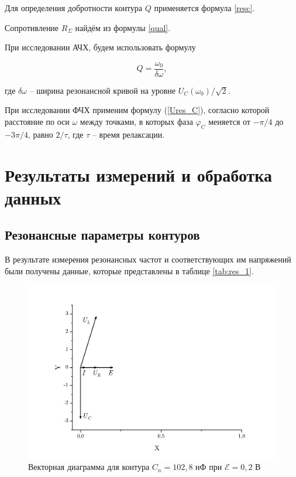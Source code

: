 \documentclass[a4paper, 12pt]{article}
\begin{document}
     Для определения добротности контура $Q$ применяется формула \eqref{resc}.
     
     Сопротивление $R_\Sigma$ найдём из формулы \eqref{qual}.
     
     При исследовании АЧХ, будем использовать формулу
    
    \begin{equation}
        \label{ACHH}
        Q = \frac{\omega_0}{\delta \omega},
    \end{equation}
    
    где $ \delta \omega $ -- ширина резонансной кривой на уровне $ U_C (\omega_0) / \sqrt{2} $.
    
    При исследовании ФЧХ применим формулу (\ref{Ures_C}), согласно которой расстояние по оси $\omega$ между точками, в которых фаза $\varphi_C$ меняется от $-\pi /4$ до $-3 \pi / 4$, равно $2 / \tau$, где $\tau$ -- время релаксации.
    
    \section{Результаты измерений и обработка данных}

    \subsection{Резонансные параметры контуров}
    \label{respar}
    
    В результате измерения резонансных частот и соответствующих им напряжений были получены данные, которые представлены в таблице \ref{tab:res_1}.

     \begin{figure}[H]
	\centering
	\includegraphics[height=0.4\textheight]{images/vec_diag.png}
	\caption{Векторная диаграмма для контура $C_n = 102,8$ нФ при $\mathcal{E} = 0,2$ В}
	\label{diag}
    \end{figure}
\end{document}

